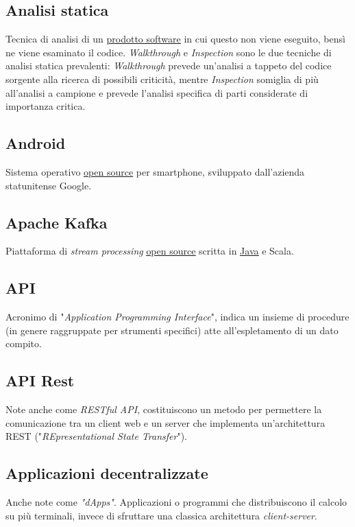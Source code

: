 	\subsection{Analisi statica}
	\label{sec:analisistatica}
	Tecnica di analisi di un \underline{\hyperref[sec:prodottosoftware]{prodotto software}} in cui questo non viene eseguito, bensì ne viene esaminato il codice.
	\emph{Walkthrough} e \emph{Inspection} sono le due tecniche di analisi statica prevalenti: \emph{Walkthrough} prevede un'analisi a tappeto del codice sorgente alla ricerca di possibili criticità, mentre \emph{Inspection} somiglia di più all'analisi a campione e prevede l'analisi specifica di parti considerate di importanza critica.

	\subsection{Android}
	\label{sec:android}
	Sistema operativo \underline{\hyperref[sec:opensource]{open source}} per smartphone, sviluppato dall'azienda statunitense Google.

	\subsection{Apache Kafka}
	\label{sec:kafka}
	Piattaforma di \emph{stream processing} \underline{\hyperref[sec:opensource]{open source}} scritta in \underline{\hyperref[sec:java]{Java}} e Scala.

	\subsection{API}
	\label{sec:api}
	Acronimo di "\emph{Application Programming Interface}", indica un insieme di procedure (in genere raggruppate per strumenti specifici) atte all'espletamento di un dato compito.

	\subsection{API Rest}
	\label{sec:apirest}
	Note anche come \emph{RESTful API}, costituiscono un metodo per permettere la comunicazione tra un client web e un server che implementa un'architettura REST ("\emph{REpresentational State Transfer}").

	\subsection{Applicazioni decentralizzate}
	\label{sec:dapps}
	Anche note come \emph{"dApps"}. Applicazioni o programmi che distribuiscono il calcolo su più terminali, invece di sfruttare una classica architettura \emph{client-server}.


